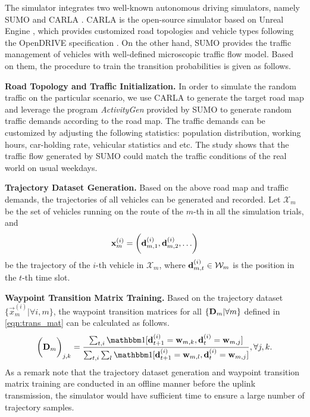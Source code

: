 The {\fwName} simulator integrates two well-known autonomous driving simulators, namely SUMO \cite{SUMO} and CARLA \cite{CARLA}.
CARLA is the open-source simulator based on Unreal Engine \cite{unrealengine}, which provides customized road topologies and vehicle types following the OpenDRIVE specification \cite{OpenDRIVE}.
On the other hand, SUMO provides the traffic management of vehicles with well-defined microscopic traffic flow model.
Based on them, the procedure to train the transition probabilities is given as follows.

\textbf{Road Topology and Traffic Initialization.} In order to simulate the random traffic on the particular scenario, we use CARLA to generate the target road map and leverage the program \emph{ActivityGen} provided by SUMO to generate random traffic demands according to the road map. The traffic demands can be customized by adjusting the following statistics: population distribution, working hours, car-holding rate, vehicular statistics and etc.
The study \cite{sumo-accuracy-mdpi} shows that the traffic flow generated by SUMO could match the traffic conditions of the real world on usual weekdays.

\textbf{Trajectory Dataset Generation.} Based on the above road map and traffic demands, the trajectories of all vehicles can be generated and recorded.
Let $\mathcal{X}_{m} $ be the set of vehicles running on the route of the $m$-th {\IAV} in all the simulation trials, and $$ \vec{x}^{(i)}_{m} = \Paren{ \vec{d}^{(i)}_{m,1}, \vec{d}^{(i)}_{m,2}, \dots }$$ be the trajectory of the $ i $-th vehicle in $\mathcal{X}_{m}$, where $\mathbf{d}^{(i)}_{m,t} \in \mathcal{W}_{m}$ is the position in the $ t $-th time slot.

\textbf{Waypoint Transition Matrix Training.} Based on the trajectory dataset $ \{\vec{x}^{(i)}_{m}  | \forall i,m\} $, the waypoint transition matrices for all {\IAVs} $ \{\mathbf{D}_{m}| \forall m\} $ defined in \eqref{eqn:trans_mat} can be calculated as follows. 
\begin{align*}
    \Paren{\TransD_{m}}_{j,k} = 
        \frac{
            \sum_{t,i} \indicator\bracket{ \vec{d}^{(i)}_{t+1}=\vec{w}_{m,k}, \vec{d}^{(i)}_{t}=\vec{w}_{m,j} }
        }{
            \sum_{t,i}\sum_{l} \indicator \bracket{ \vec{d}^{(i)}_{t+1}=\vec{w}_{m,l}, \vec{d}^{(i)}_{t}=\vec{w}_{m,j} }
        }, \forall j,k.
\end{align*}
As a remark note that the trajectory dataset generation and waypoint transition matrix training are conducted in an offline manner before the uplink transmission, the {\fwName} simulator would have sufficient time to ensure a large number of trajectory samples. 

